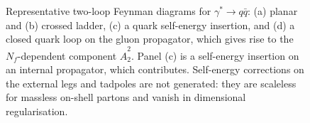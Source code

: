 \begin{figure}[h!]
\caption{Representative two-loop Feynman diagrams for $\gamma^*\to q\bar q$: (a) planar and (b) crossed ladder, (c) a quark self-energy insertion, and (d) a closed quark loop on the gluon propagator, which gives rise to the $N_f$-dependent component $\hat A_2^2$. Panel (c) is a self-energy insertion on an internal propagator, which contributes. Self-energy corrections on the external legs and tadpoles are not generated: they are scaleless for massless on-shell partons and vanish in dimensional regularisation.}
\label{fig:diagA22}
\end{figure}
